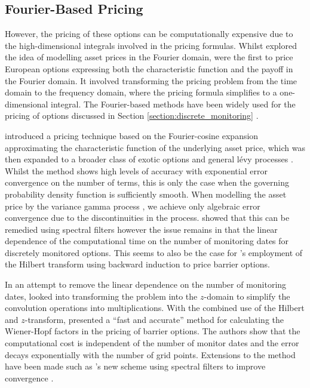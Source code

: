 \documentclass[a4paper]{report}
\begin{document}
\subsection{Fourier-Based Pricing}
However, the pricing of these options can be computationally expensive due to the high-dimensional integrals involved in the pricing formulas. Whilst \citet{heston1993closed} explored the idea of modelling asset prices in the Fourier domain, \citet{carr1999option} were the first to price European options expressing both the characteristic function and the payoff in the Fourier domain. It involved transforming the pricing problem from the time domain to the frequency domain, where the pricing formula simplifies to a one-dimensional integral. The Fourier-based methods have been widely used for the pricing of options discussed in Section \ref{section:discrete_monitoring} \citep{eberlein2010analysis}.

\citet{fang2009novel} introduced a pricing technique based on the Fourier-cosine expansion approximating the characteristic function of the underlying asset price, which was then expanded to a broader class of exotic options \citep{fang2009pricing, fang2011fourier} and general l\'evy processes \citep{lord2008fast}. Whilst the method shows high levels of accuracy with exponential error convergence on the number of terms, this is only the case when the governing probability density function is sufficiently smooth. When modelling the asset price by the variance gamma process \citep{madan1998variance}, we achieve only algebraic error convergence due to the discontinuities in the process. \citet{ruijter2015application} showed that this can be remedied using spectral filters however the issue remains in that the linear dependence of the computational time on the number of monitoring dates for discretely monitored options. This seems to also be the case for \citet{feng2008pricing}'s employment of the Hilbert transform using backward induction to price barrier options. 

In an attempt to remove the linear dependence on the number of monitoring dates, \citet{fusai2006exact} looked into transforming the problem into the $z$-domain to simplify the convolution operations into multiplications. With the combined use of the Hilbert and $z$-transform, \citet{fusai2016spitzer} presented a ``fast and accurate'' method for calculating the Wiener-Hopf factors in the pricing of barrier options. The authors show that the computational cost is independent of the number of monitor dates and the error decays exponentially with the number of grid points. Extensions to the method have been made such as \citet{phelan2018fourier}'s new scheme using spectral filters to improve convergence \citep{phelan2019hilbert}.
\end{document}
